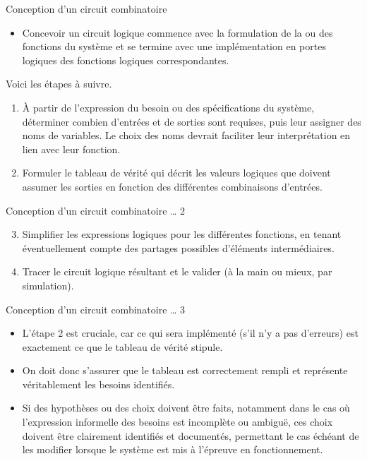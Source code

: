 \documentclass[presentation]{beamer}
\begin{document}
\begin{frame}[label={sec:org6a4b44b}]{Conception d'un circuit combinatoire}
\begin{itemize}
\item Concevoir un circuit logique commence avec la formulation de la ou des fonctions du système et se termine avec une implémentation en portes logiques des fonctions logiques correspondantes.
\end{itemize}

Voici les étapes à suivre.

\begin{enumerate}
\item À partir de l'expression du besoin ou des spécifications du
système, déterminer combien d'entrées et de sorties sont
requises, puis leur assigner des noms de variables. Le choix des noms
devrait faciliter leur interprétation en lien avec leur fonction.

\item Formuler le tableau de vérité qui décrit les valeurs logiques que
doivent assumer les sorties en fonction des différentes
combinaisons d'entrées.
\end{enumerate}
\end{frame}

\begin{frame}[label={sec:orge2f9b5a}]{Conception d'un circuit combinatoire \ldots{} 2}
\begin{enumerate}
\setcounter{enumi}{2}
\item Simplifier les expressions logiques pour les différentes fonctions,
en tenant éventuellement compte des partages possibles d'éléments
intermédiaires.

\item Tracer le circuit logique résultant et le valider (à la main ou
mieux, par simulation).
\end{enumerate}
\end{frame}

\begin{frame}[label={sec:org597044d}]{Conception d'un circuit combinatoire \ldots{} 3}
\begin{itemize}
\item L'étape 2 est cruciale, car ce qui sera implémenté (s'il n'y a pas d'erreurs) est exactement ce que le tableau de vérité stipule.

\item On doit donc s'assurer que le tableau est correctement rempli et représente véritablement les besoins identifiés.

\item Si des hypothèses ou des choix doivent être faits, notamment dans le cas où l'expression informelle des besoins est incomplète ou ambiguë, ces choix doivent être clairement identifiés et documentés, permettant le cas échéant de les modifier lorsque le système est mis à l'épreuve en fonctionnement.
\end{itemize}
\end{frame}
\end{document}
